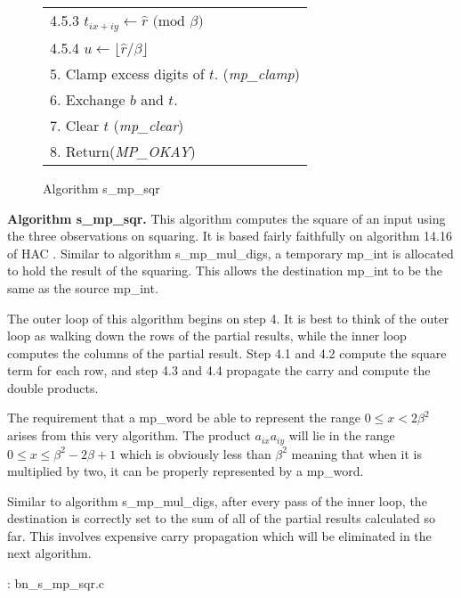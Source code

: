 \documentclass[b5paper]{book}
\begin{document}
\begin{figure}[!here]
\begin{small}
\begin{center}
\begin{tabular}{l}
\hspace{6mm}4.5.3  $t_{ix + iy} \leftarrow \hat r \mbox{ (mod }\beta\mbox{)}$ \\
\hspace{6mm}4.5.4  $u \leftarrow \lfloor \hat r / \beta \rfloor$ \\
5.  Clamp excess digits of $t$.  (\textit{mp\_clamp}) \\
6.  Exchange $b$ and $t$. \\
7.  Clear $t$ (\textit{mp\_clear}) \\
8.  Return(\textit{MP\_OKAY}) \\
\hline
\end{tabular}
\end{center}
\end{small}
\caption{Algorithm s\_mp\_sqr}
\end{figure}

\textbf{Algorithm s\_mp\_sqr.}
This algorithm computes the square of an input using the three observations on squaring.  It is based fairly faithfully on  algorithm 14.16 of HAC
\cite[pp.596-597]{HAC}.  Similar to algorithm s\_mp\_mul\_digs, a temporary mp\_int is allocated to hold the result of the squaring.  This allows the 
destination mp\_int to be the same as the source mp\_int.

The outer loop of this algorithm begins on step 4. It is best to think of the outer loop as walking down the rows of the partial results, while
the inner loop computes the columns of the partial result.  Step 4.1 and 4.2 compute the square term for each row, and step 4.3 and 4.4 propagate
the carry and compute the double products.  

The requirement that a mp\_word be able to represent the range $0 \le x < 2 \beta^2$ arises from this
very algorithm.  The product $a_{ix}a_{iy}$ will lie in the range $0 \le x \le \beta^2 - 2\beta + 1$ which is obviously less than $\beta^2$ meaning that
when it is multiplied by two, it can be properly represented by a mp\_word.

Similar to algorithm s\_mp\_mul\_digs, after every pass of the inner loop, the destination is correctly set to the sum of all of the partial 
results calculated so far.  This involves expensive carry propagation which will be eliminated in the next algorithm.  

\vspace{+3mm}\begin{small}
\hspace{-5.1mm}{\bf File}: bn\_s\_mp\_sqr.c
\vspace{-3mm}
\begin{alltt}
\end{alltt}
\end{small}
\end{document}
